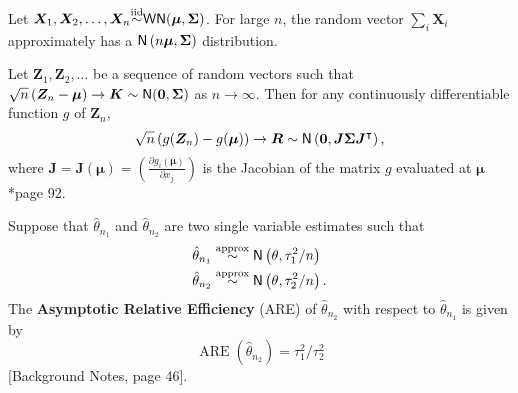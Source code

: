 \begin{thm} \label{thm: mv_cen_lim_thrm}
    Let $\bm{X}_1 , \bm{X}_2 , \ldots , \bm{X}_n {\overset{\text{iid}}{\sim}} {\sf WN} (\bm{\mu} , \bm{\Sigma})$. For large $n$, the random vector $\sum_{i} \bm{X}_i$ approximately has a ${\sf N} \left( n \bm{\mu} , \bm{\Sigma} \right)$ distribution.
\end{thm}

\begin{thm} \label{thm: delta_ethod}
    Let $\bm{Z}_1 , \bm{Z}_2 , \ldots $ be a sequence of random vectors such that $\sqrt{n} \left( \bm{Z}_{n} - \bm{\mu} \right) \to \bm{K} \sim {\sf N} (\bm{0} , \bm{\Sigma})$ as $n \to \infty$. Then for any continuously differentiable function $g$ of $\bm{Z}_{n}$,
    \begin{equation*}
        \sqrt{n} \left( g (\bm{Z}_n) - g (\bm{\mu}) \right) \to \bm{R} \sim {\sf N} \left( \bm{0} , \bm{J} \bm{\Sigma} \bm{J}^{\intercal} \right),
    \end{equation*}
    where $\bm{J} = \bm{J} (\bm{\mu}) = \left( \frac{\partial g_i (\bm{\mu})}{\partial x_j} \right)$ is the Jacobian of the matrix $g$ evaluated at $\bm{\mu}$ \cite{KroeseDirkP2013SMaC}*{page 92}.
\end{thm}

\begin{defe} \label{defe: are}
    Suppose that $\hat{\theta}_{n_1}$ and $\hat{\theta}_{n_2}$ are two single variable estimates such that
    \begin{align*}
        \hat{\theta}_{n_1} & \overset{\text{approx}}{\sim} {\sf N} \left( \theta , \tau_1^2 / n \right)  \\
        \hat{\theta}_{n_2} & \overset{\text{approx}}{\sim} {\sf N} \left( \theta , \tau_2^2 / n \right).
    \end{align*}
    The {\bf Asymptotic Relative Efficiency} (ARE) of $\hat{\theta}_{n_2}$ with respect to $\hat{\theta}_{n_1}$ is given by
    \begin{equation*}
        \operatorname{ARE} (\hat{\theta}_{n_2}) = \tau_1^2 / \tau_2^2
    \end{equation*}
    [Background Notes, page 46].
\end{defe}

